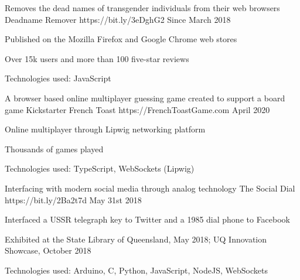 


\begin{cventries}

\cventry
{Removes the dead names of transgender individuals from their web browsers} %
{Deadname Remover} %
{https://bit.ly/3eDghG2} %
{Since March 2018} %
{ %
\begin{cvitems}
\item Published on the Mozilla Firefox and Google Chrome web stores
\item Over 15k users and more than 100 five-star reviews
\item Technologies used: JavaScript
\end{cvitems}
}

\cventry
{A browser based online multiplayer guessing game created to support a board game Kickstarter} %
{French Toast} %
{https://FrenchToastGame.com} %
{April 2020} %
{ %
\begin{cvitems}
\item Online multiplayer through Lipwig networking platform
\item Thousands of games played
\item Technologies used: TypeScript, WebSockets (Lipwig)
\end{cvitems}
}

\cventry
{Interfacing with modern social media through analog technology} %
{The Social Dial} %
{https://bit.ly/2Ba2t7d} %
{May 31st 2018} %
{ %
\begin{cvitems}
\item Interfaced a USSR telegraph key to Twitter and a 1985 dial phone to Facebook
\item Exhibited at the State Library of Queensland, May 2018; UQ Innovation Showcase, October 2018
\item Technologies used: Arduino, C, Python, JavaScript, NodeJS, WebSockets
\end{cvitems}
}


\end{cventries}
